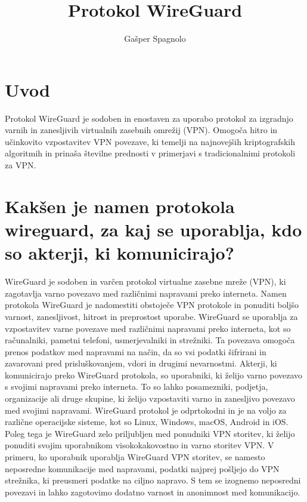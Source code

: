 \documentclass[a4paper, 11pt]{article}
\title{Protokol WireGuard}
\author{Gašper Spagnolo}
\begin{document}
\maketitle
\tableofcontents

\section{Uvod}
Protokol WireGuard je sodoben in enostaven za uporabo protokol za izgradnjo varnih in zanesljivih virtualnih zasebnih omrežij (VPN). Omogoča hitro in učinkovito vzpostavitev VPN povezave, ki temelji na najnovejših kriptografskih algoritmih in prinaša številne prednosti v primerjavi s tradicionalnimi protokoli za VPN.
\pagebreak

\section{Kakšen je namen protokola wireguard, za kaj se uporablja, kdo so akterji, ki komunicirajo?}

WireGuard je sodoben in varčen protokol virtualne zasebne mreže (VPN), ki zagotavlja varno povezavo med različnimi napravami preko interneta. 
Namen protokola WireGuard je nadomestiti obstoječe VPN protokole in ponuditi boljšo varnost, zanesljivost, hitrost in preprostost uporabe.
WireGuard se uporablja za vzpostavitev varne povezave med različnimi napravami preko interneta, 
kot so računalniki, pametni telefoni, usmerjevalniki in strežniki. Ta povezava omogoča prenos podatkov med napravami na način, da so vsi podatki šifrirani in zavarovani pred prisluškovanjem,
vdori in drugimi nevarnostmi. Akterji, ki komunicirajo preko WireGuard protokola, so uporabniki, ki želijo varno povezavo s svojimi napravami preko interneta. To so lahko posamezniki, podjetja, 
organizacije ali druge skupine, ki želijo vzpostaviti varno in zanesljivo povezavo med svojimi napravami.
WireGuard protokol je odprtokodni in je na voljo za različne operacijske sisteme, kot so Linux, Windows, macOS, Android in iOS. 
Poleg tega je WireGuard zelo priljubljen med ponudniki VPN storitev, ki želijo ponuditi svojim uporabnikom visokokakovostno in varno storitev VPN.
V primeru, ko uporabnik uporablja WireGuard VPN storitev, se namesto neposredne komunikacije med napravami, podatki najprej pošljejo do VPN strežnika, 
ki preusmeri podatke na ciljno napravo. S tem se izognemo neposredni povezavi in lahko zagotovimo dodatno varnost in anonimnost med komunikacijo.
\end{document}
